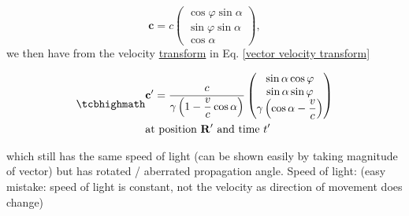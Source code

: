 \begin{equation}%
	\mathbf{c} = c
	\begin{pmatrix}
		\cos{\varphi}\sin{\alpha} \\ \sin{\varphi}\sin{\alpha} \\ \cos{\alpha}
	\end{pmatrix},
\end{equation}%
we then have from the velocity \hyperlink{def-transform}{transform} in Eq. \eqref{vector velocity transform}


\begin{equation}%
	\label{light speed velocity transform}
	\mhl{
		\begin{aligned}
			 & \mathbf{c'} = \dfrac{c}{\gamma\left(1- \dfrac{v}{c} \cos\alpha\right) }
			\begin{pmatrix}
				\sin\alpha\cos\varphi \\ \sin\alpha\sin\varphi  \\ \gamma \left( \cos\alpha  - \dfrac{v}{c}  \right) \\
			\end{pmatrix} \\
			 & \text{at position $\mathbf{R'}$ and time $t'$ }
		\end{aligned}
	}
\end{equation}%

which still has the same speed of light (can be shown easily by taking magnitude of vector) but has rotated / aberrated propagation angle. \newline
Speed of light: (easy mistake: speed of light is constant, not the velocity as direction of movement does change)\newline



